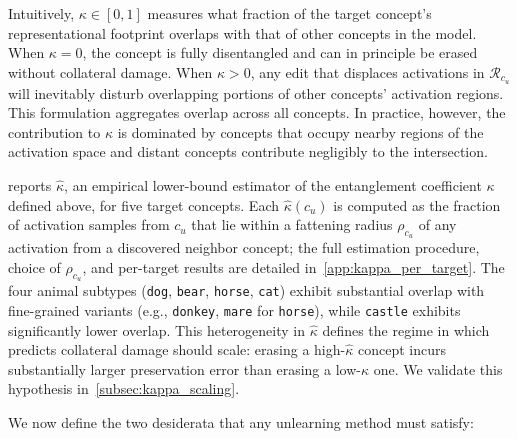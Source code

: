 \noindent Intuitively, $\kappa \in [0,1]$ measures what fraction of the target concept's representational footprint overlaps with that of other concepts in the model. When $\kappa = 0$, the concept is fully disentangled and can in principle be erased without collateral damage. When $\kappa > 0$, any edit that displaces activations in $\mathcal{R}_{c_u}$ will inevitably disturb overlapping portions of other concepts' activation regions.
This formulation aggregates overlap across all concepts. In practice, however, the contribution to $\kappa$ is dominated by concepts that occupy nearby regions of the activation space and distant concepts contribute negligibly to the intersection. 

 reports $\hat\kappa$, an empirical lower-bound estimator of the entanglement coefficient $\kappa$ defined above, for five target concepts.
Each $\hat\kappa(c_u)$ is computed as the fraction of activation samples from $c_u$ that lie within a fattening radius $\rho_{c_u}$ of any activation from a discovered neighbor concept; the full estimation procedure, choice of $\rho_{c_u}$, and per-target results are detailed in~\cref{app:kappa_per_target}.
The four animal subtypes (\texttt{dog}, \texttt{bear}, \texttt{horse}, \texttt{cat}) exhibit substantial overlap with fine-grained variants (e.g., \texttt{donkey}, \texttt{mare} for \texttt{horse}), while \texttt{castle} exhibits significantly lower overlap. %
This heterogeneity in $\hat\kappa$ defines the regime in which~ predicts collateral damage should scale: erasing a high-$\hat\kappa$ concept incurs substantially larger preservation error than erasing a low-$\hat\kappa$ one. We validate this hypothesis in~\cref{subsec:kappa_scaling}. 

We now define the two desiderata that any unlearning method must satisfy:

